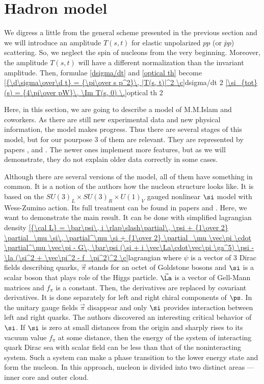 
\section{Hadron model}

We digress a little from the general scheme presented in the previous section and we will introduce an amplitude $T(s, t)$ for elastic unpolarized $pp$ (or $\bar pp$) scattering. So, we neglect the spin of nucleons from the very beginning. Moreover, the amplitude $T(s, t)$ will have a different normalization than the invariant amplitude. Then, formulae \ref{dsigma/dt} and \ref{optical th} become 
\eqref{{\d\sigma\over\d t} = {\pi\over s p^2}\, |T(s, t)|^2 \c}{dsigma/dt 2}
\eqref{\si_{tot}(s) =  {4\pi\over pW}\, \Im T(s, 0) \.}{optical th 2}

Here, in this section, we are going to describe a model of M.M.Islam and coworkers. As there are still new experimental data and new physical information, the model makes progress. Thus there are several stages of this model, but for our pourpose 3 of them are relevant. They are represented by papers ,  and . The newer ones implement more features, but as we will demonstrate, they do not explain older data correctly in some cases.

Although there are several versions of the model, all of them have something in common. It is a notion of the authors how the nucleon structure looks like. It is based on the $SU(3)_L\times SU(3)_R \times U(1)_V$ gauged nonlinear $\si$ model with Wess-Zumino action. Its full treatment can be found in papers  and . Here, we want to demonstrate the main result. It can be done with simplified lagrangian density
\eqref{{\cal L} = \bar\psi\, i \rlap\slash\partial\, \psi + {1\over 2} \partial_\mu \si\, \partial^\mu \si + {1\over 2} \partial_\mu \vec\pi \cdot \partial^\mu \vec\pi - G\, \bar\psi (\si + i \vec\La\cdot\vec\pi \ga^5) \psi - \la (\si^2 + \vec\pi^2 - f_\pi^2)^2 \c}{lagrangian}
where $\psi$ is a vector of 3 Dirac fields describing quarks, $\vec\pi$ stands for an octet of Goldstone bosons and $\si$ is a scalar boson that plays role of the Higgs particle. $\vec\La$ is a vector of Gell-Mann matrices and $f_\pi$ is a constant. Then, the derivatives are replaced by covariant derivatives. It is done separately for left and right chiral components of $\ps$. In the unitary gauge fields $\vec\pi$ disappear and only $\si$ provides interaction between left and right quarks. The authors discovered an interesting critical behavior of $\si$. If $\si$ is zero at small distances from the origin and sharply rises to its vacuum value $f_\pi$ at some distance, then the energy of the system of interacting quark Dirac sea with scalar field can be less than that of the noninteracting system. Such a system can make a phase transition to the lower energy state and form the nucleon. In this approach, nucleon is divided into two distinct areas --- inner core and outer cloud.

